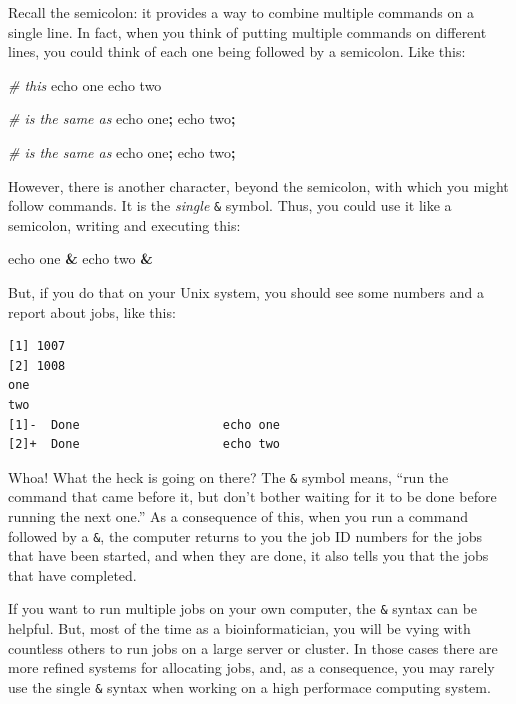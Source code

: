 \documentclass[]{krantz}
\makeatletter
\newenvironment{Shaded}{\begin{snugshade}}{\end{snugshade}}
\newcommand{\BuiltInTok}[1]{#1}
\newcommand{\CommentTok}[1]{\textcolor[rgb]{0.37,0.37,0.37}{\textit{#1}}}
\newcommand{\KeywordTok}[1]{\textcolor[rgb]{0.27,0.27,0.27}{\textbf{#1}}}
\newcommand{\NormalTok}[1]{#1}
\newenvironment{kframe}{%
\medskip{}
\setlength{\fboxsep}{.8em}
 \def\at@end@of@kframe{}%
 \ifinner\ifhmode%
  \def\at@end@of@kframe{\end{minipage}}%
  \begin{minipage}{\columnwidth}%
 \fi\fi%
 \def\FrameCommand##1{\hskip\@totalleftmargin \hskip-\fboxsep
 \colorbox{shadecolor}{##1}\hskip-\fboxsep
     \hskip-\linewidth \hskip-\@totalleftmargin \hskip\columnwidth}%
 \MakeFramed {\advance\hsize-\width
   \@totalleftmargin\z@ \linewidth\hsize
   \@setminipage}}%
 {\par\unskip\endMakeFramed%
 \at@end@of@kframe}
\renewenvironment{Shaded}{\begin{kframe}}{\end{kframe}}
\makeatother
\begin{document}
Recall the semicolon: it provides a way to combine multiple commands on a single line.
In fact, when you think of putting multiple commands on different lines, you could
think of each one being followed by a semicolon. Like this:

\begin{Shaded}
\begin{Highlighting}[]
\CommentTok{# this}
\BuiltInTok{echo}\NormalTok{ one}
\BuiltInTok{echo}\NormalTok{ two}

\CommentTok{# is the same as}
\BuiltInTok{echo}\NormalTok{ one}\KeywordTok{;}
\BuiltInTok{echo}\NormalTok{ two}\KeywordTok{;}

\CommentTok{# is the same as}
\BuiltInTok{echo}\NormalTok{ one}\KeywordTok{;} \BuiltInTok{echo}\NormalTok{ two}\KeywordTok{;}
\end{Highlighting}
\end{Shaded}

However, there is another character, beyond the semicolon, with which you might
follow commands. It is the \emph{single} \texttt{\&} symbol. Thus,
you could use it like a semicolon, writing and executing this:

\begin{Shaded}
\begin{Highlighting}[]
\BuiltInTok{echo}\NormalTok{ one }\KeywordTok{&} \BuiltInTok{echo}\NormalTok{ two }\KeywordTok{&}
\end{Highlighting}
\end{Shaded}

But, if you do that on your Unix system, you should see some numbers and a report
about jobs, like this:

\begin{verbatim}
[1] 1007
[2] 1008
one
two
[1]-  Done                    echo one
[2]+  Done                    echo two
\end{verbatim}

Whoa! What the heck is going on there? The \texttt{\&} symbol means, ``run the command that
came before it, but don't bother waiting for it to be done before running the next one.''
As a consequence of this, when you run a command followed by a \texttt{\&}, the computer returns to you
the job ID numbers for the jobs that have been started, and when they are done, it
also tells you that the jobs that have completed.

If you want to run multiple jobs on your own computer, the \texttt{\&} syntax can be helpful.
But, most of the time as a bioinformatician, you will be vying with countless others
to run jobs on a large server or cluster. In those cases there are more refined
systems for allocating jobs, and, as a consequence, you may rarely use the single \texttt{\&}
syntax when working on a high performace computing system.
\end{document}
